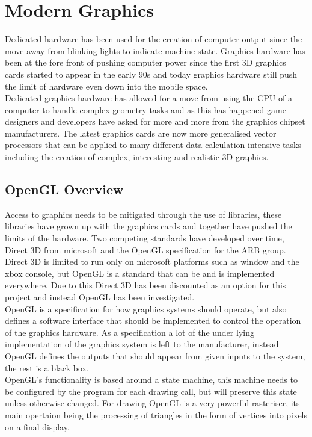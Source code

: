 \section{Modern Graphics}
Dedicated hardware has been used for the creation of computer output since the
move away from blinking lights to indicate machine state. Graphics hardware has
been at the fore front of pushing computer power since the first 3D graphics 
cards started to appear in the early 90s and today graphics hardware still push
the limit of hardware even down into the mobile space.\\

Dedicated graphics hardware has allowed for a move from using the CPU of a 
computer to handle complex geometry tasks and as this has happened game designers
and developers have asked for more and more from the graphics chipset
manufacturers. The latest graphics cards are now more generalised vector 
processors that can be applied to many different data calculation intensive tasks
including the creation of complex, interesting and realistic 3D graphics.\\

\subsection{OpenGL Overview} 
Access to graphics needs to be mitigated through the use of libraries, these 
libraries have grown up with the graphics cards and together have pushed the 
limits of the hardware. Two competing standards have developed over time, Direct
3D from microsoft and the OpenGL specification for the ARB group. Direct 3D is 
limited to run only on microsoft platforms such as window and the xbox console,
but OpenGL is a standard that can be and is implemented everywhere. Due to this
Direct 3D has been discounted as an option for this project and instead OpenGL
has been investigated.\\

OpenGL is a specification for how graphics systems should operate, but also 
defines a software interface that should be implemented to control the operation
of the graphics hardware. As a specification a lot of the under lying 
implementation of the graphics system is left to the manufacturer, instead 
OpenGL defines the outputs that should appear from given inputs to the system,
the rest is a black box.\\

OpenGL's functionality is based around a state machine, this machine needs to be
configured by the program for each drawing call, but will preserve this state 
unless otherwise changed. For drawing OpenGL is a very powerful rasteriser, its
main opertaion being the processing of triangles in the form of vertices into
pixels on a final display. \\

